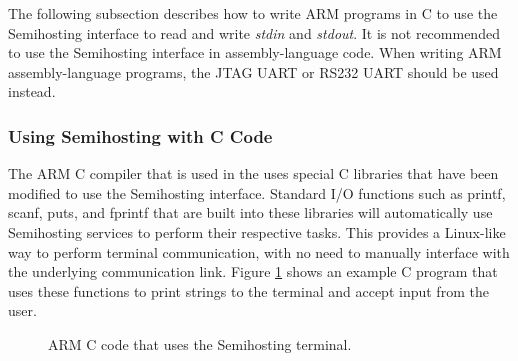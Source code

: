 \documentclass[11pt, twoside, pdftex]{article}
\begin{document}
The following subsection describes how to write ARM programs in C to use the Semihosting interface to read and write \textit{stdin} and \textit{stdout}. It is not recommended to use the Semihosting interface in assembly-language code. When writing ARM assembly-language programs, the JTAG UART or RS232 UART should be used instead.

\subsubsection{Using Semihosting with C Code}

The ARM C compiler that is used in the \productNameMed{} uses special C libraries that have been modified to use the Semihosting interface. Standard I/O functions such as printf, scanf, puts, and fprintf that are built into these libraries will automatically use Semihosting services to perform their respective tasks. This provides a Linux-like way to perform terminal communication, with no need to manually interface with the underlying communication link. Figure \ref{fig:semihosting_c} shows an example C program that uses these functions to print strings to the terminal and accept input from the user. 

\begin{figure}[h!]

\caption{ARM C code that uses the Semihosting terminal.}
   \label{fig:semihosting_c}
\end{figure}



\end{document}
